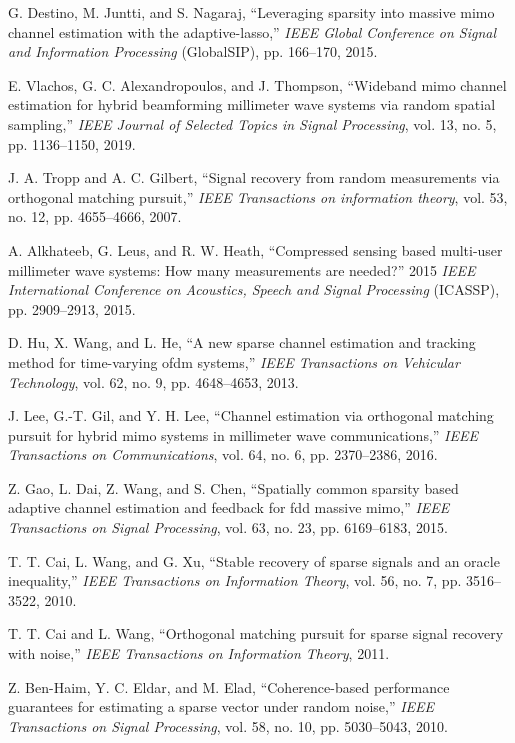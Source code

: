 \documentclass[journal]{IEEEtran}
\begin{document}
{\begin{thebibliography}{30}
G. Destino, M. Juntti, and S. Nagaraj, “Leveraging sparsity into massive mimo channel estimation with the adaptive-lasso,” \textit {IEEE Global Conference on Signal and Information Processing} (GlobalSIP), pp. 166–170, 2015.

E. Vlachos, G. C. Alexandropoulos, and J. Thompson, “Wideband mimo channel estimation for hybrid beamforming millimeter wave systems via random spatial sampling,” \textit {IEEE Journal of Selected Topics in Signal Processing}, vol. 13, no. 5, pp. 1136–1150, 2019.

J. A. Tropp and A. C. Gilbert, “Signal recovery from random measurements via orthogonal matching pursuit,” \textit {IEEE Transactions on information theory}, vol. 53, no. 12, pp. 4655–4666, 2007.

A. Alkhateeb, G. Leus, and R. W. Heath, “Compressed sensing based multi-user millimeter wave systems: How many measurements are needed?” 2015 \textit {IEEE International Conference on Acoustics, Speech and Signal Processing} (ICASSP), pp. 2909–2913, 2015.

D. Hu, X. Wang, and L. He, “A new sparse channel estimation and tracking method for time-varying ofdm systems,” \textit {IEEE Transactions on Vehicular Technology}, vol. 62, no. 9, pp. 4648–4653, 2013.

J. Lee, G.-T. Gil, and Y. H. Lee, “Channel estimation via orthogonal matching pursuit for hybrid mimo systems in millimeter wave communications,” \textit {IEEE Transactions on Communications}, vol. 64, no. 6, pp. 2370–2386, 2016.

Z. Gao, L. Dai, Z. Wang, and S. Chen, “Spatially common sparsity based adaptive channel estimation and feedback for fdd massive mimo,” \textit {IEEE Transactions on Signal Processing}, vol. 63, no. 23, pp. 6169–6183, 2015.

T. T. Cai, L. Wang, and G. Xu, “Stable recovery of sparse signals and an oracle inequality,” \textit {IEEE Transactions on Information Theory}, vol. 56, no. 7, pp. 3516–3522, 2010.

T. T. Cai and L. Wang, “Orthogonal matching pursuit for sparse signal recovery with noise,” \textit {IEEE Transactions on Information Theory}, 2011.

Z. Ben-Haim, Y. C. Eldar, and M. Elad, “Coherence-based performance guarantees for estimating a sparse vector under random noise,” \textit {IEEE Transactions on Signal Processing}, vol. 58, no. 10, pp. 5030–5043, 2010.


\end{thebibliography}}
\end{document}

